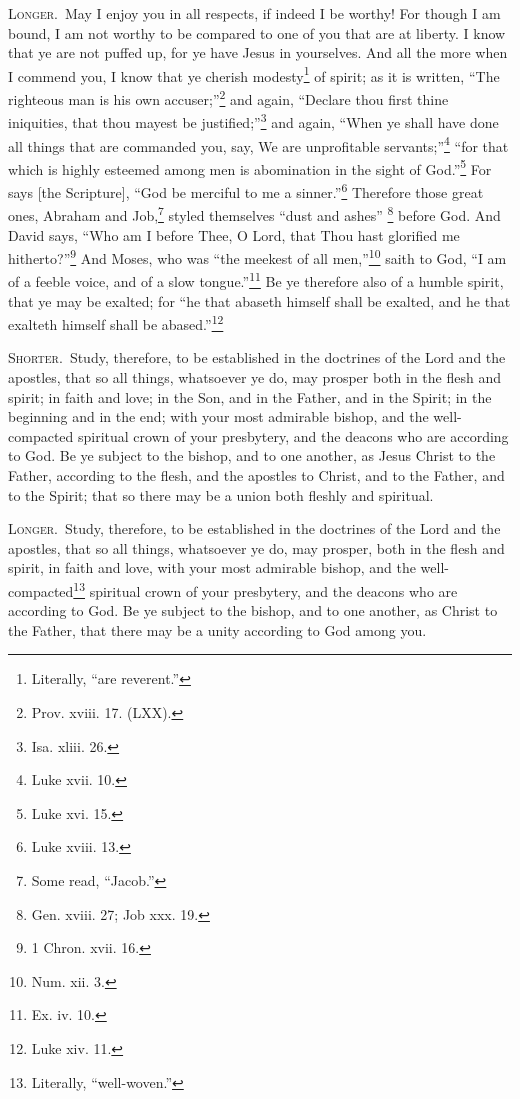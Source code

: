 \textsc{Longer.}~May I enjoy you in all respects, if indeed I be worthy! For though I am bound, I am not worthy to be compared to one of you that are at liberty. I know that ye are not puffed up, for ye have Jesus in yourselves. And all the more when I commend you, I know that ye cherish modesty\footnote{Literally, “are reverent.”} of spirit; as it is written, “The righteous man is his own accuser;”\footnote{Prov. xviii. 17. (LXX).} and again, “Declare thou first thine iniquities, that thou mayest be justified;”\footnote{Isa. xliii. 26.} and again, “When ye shall have done all things that are commanded you, say, We are unprofitable servants;”\footnote{Luke xvii. 10.} “for that which is highly esteemed among men is abomination in the sight of God.”\footnote{Luke xvi. 15.} For says [the Scripture], “God be merciful to me a sinner.”\footnote{Luke xviii. 13.} Therefore those great ones, Abraham and Job,\footnote{Some read, “Jacob.”} styled themselves “dust and ashes” \footnote{Gen. xviii. 27; Job xxx. 19.} before God. And David says, “Who am I before Thee, O Lord, that Thou hast glorified me hitherto?”\footnote{1 Chron. xvii. 16.} And Moses, who was “the meekest of all men,”\footnote{Num. xii. 3.} saith to God, “I am of a feeble voice, and of a slow tongue.”\footnote{Ex. iv. 10.} Be ye therefore also of a humble spirit, that ye may be exalted; for “he that abaseth himself shall be exalted, and he that exalteth himself shall be abased.”\footnote{Luke xiv. 11.}


\textsc{Shorter.}~Study, therefore, to be established in the doctrines of the Lord and the apostles, that so all things, whatsoever ye do, may prosper both in the flesh and spirit; in faith and love; in the Son, and in the Father, and in the Spirit; in the beginning and in the end; with your most admirable bishop, and the well-compacted spiritual crown of your presbytery, and the deacons who are according to God. Be ye subject to the bishop, and to one another, as Jesus Christ to the Father,  according to the flesh, and the apostles to Christ, and to the Father, and to the Spirit; that so there may be a union both fleshly and spiritual.

\textsc{Longer.}~Study, therefore, to be established in the doctrines of the Lord and the apostles, that so all things, whatsoever ye do, may prosper, both in the flesh and spirit, in faith and love, with your most admirable bishop, and the well-compacted\footnote{Literally, “well-woven.”} spiritual crown of your presbytery, and the deacons who are according to God. Be ye subject to the bishop, and to one another, as Christ to the Father, that there may be a unity according to God among you.

